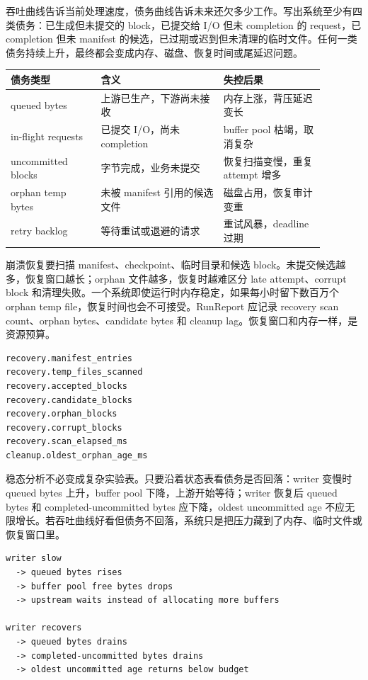 吞吐曲线告诉当前处理速度，债务曲线告诉未来还欠多少工作。写出系统至少有四类债务：已生成但未提交的 block，已提交给 I/O 但未 completion 的 request，已 completion 但未 manifest 的候选，已过期或迟到但未清理的临时文件。任何一类债务持续上升，最终都会变成内存、磁盘、恢复时间或尾延迟问题。

\begin{center}
\begin{tabular}{p{0.25\linewidth}p{0.34\linewidth}p{0.29\linewidth}}
\toprule
债务类型 & 含义 & 失控后果 \\
\midrule
queued bytes & 上游已生产，下游尚未接收 & 内存上涨，背压延迟变长 \\
in-flight requests & 已提交 I/O，尚未 completion & buffer pool 枯竭，取消复杂 \\
uncommitted blocks & 字节完成，业务未提交 & 恢复扫描变慢，重复 attempt 增多 \\
orphan temp bytes & 未被 manifest 引用的候选文件 & 磁盘占用，恢复审计变重 \\
retry backlog & 等待重试或退避的请求 & 重试风暴，deadline 过期 \\
\bottomrule
\end{tabular}
\end{center}

崩溃恢复要扫描 manifest、checkpoint、临时目录和候选 block。未提交候选越多，恢复窗口越长；orphan 文件越多，恢复时越难区分 late attempt、corrupt block 和清理失败。一个系统即使运行时内存稳定，如果每小时留下数百万个 orphan temp file，恢复时间也会不可接受。RunReport 应记录 recovery scan count、orphan bytes、candidate bytes 和 cleanup lag。恢复窗口和内存一样，是资源预算。

\begin{lstlisting}[numbers=none,caption={恢复窗口指标}]
recovery.manifest_entries
recovery.temp_files_scanned
recovery.accepted_blocks
recovery.candidate_blocks
recovery.orphan_blocks
recovery.corrupt_blocks
recovery.scan_elapsed_ms
cleanup.oldest_orphan_age_ms
\end{lstlisting}

稳态分析不必变成复杂实验表。只要沿着状态表看债务是否回落：writer 变慢时 queued bytes 上升，buffer pool 下降，上游开始等待；writer 恢复后 queued bytes 和 completed-uncommitted bytes 应下降，oldest uncommitted age 不应无限增长。若吞吐曲线好看但债务不回落，系统只是把压力藏到了内存、临时文件或恢复窗口里。

\begin{lstlisting}[numbers=none,caption={稳态判读的最小链条}]
writer slow
  -> queued bytes rises
  -> buffer pool free bytes drops
  -> upstream waits instead of allocating more buffers

writer recovers
  -> queued bytes drains
  -> completed-uncommitted bytes drains
  -> oldest uncommitted age returns below budget
\end{lstlisting}

